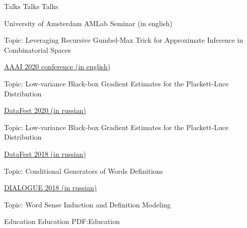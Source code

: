 \documentclass[letterpaper,MMMyyyy,nonstopmode]{simpleresumecv}
\begin{document}
\begin{Body}

\Section
{Talks}
{Talks}
{Talks}

\Item
University of Amsterdam AMLab Seminar (in english)
\hfill
{}
\begin{Detail}
\Item
Topic: Leveraging Recursive Gumbel-Max Trick for Approximate Inference in Combinatorial Spaces
\end{Detail}

\Item
\href{https://aaai.org/Conferences/AAAI-20/}{AAAI 2020 conference (in english)}
\hfill
{}
\begin{Detail}
\Item
Topic: Low-variance Black-box Gradient Estimates for the Plackett-Luce Distribution
\end{Detail}

\Item
\href{http://datafest.ru}{DataFest 2020 (in russian)}
\hfill
{}
\begin{Detail}
\Item
Topic: Low-variance Black-box Gradient Estimates for the Plackett-Luce Distribution
\end{Detail}

\Item
\href{http://datafest.ru}{DataFest 2018 (in russian)}
\hfill
{}
\begin{Detail}
\Item
Topic: Conditional Generators of Words Definitions
\end{Detail}

\Gap
\Item
\href{http://www.dialog-21.ru/en/}{DIALOGUE 2018 (in russian)}
\hfill
{}
\begin{Detail}
\Item
Topic: Word Sense Induction and Definition Modeling
\end{Detail}




\Section
{Education}
{Education}
{PDF:Education}

\iffalse
\Entry
\href{https://www.hse.ru/en/}
{\textbf{National Research University Higher School of Economics}}
\par
Moscow, Russia

\Gap
\BulletItem
Ph.D. in
\href{https://aspirantura.hse.ru/en/cs/}
{Computer Science}
\hfill
\DatestampY{2020} --
Present
\begin{Detail}
\SubBulletItem
Scientific supervisor: \href{https://www.hse.ru/en/staff/dvetrov}{Dmitry Vetrov}
\SubBulletItem
Thesis: Monte Carlo Gradient Estimation for Discrete Latent Variable Models
\end{Detail}
\Gap
\fi


\end{Body}
\end{document}
